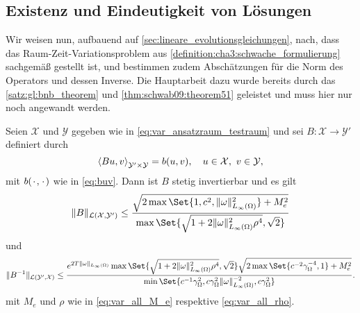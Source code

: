 \subsection{Existenz und Eindeutigkeit von Lösungen} %
\label{sub:existenz_und_eindeutigkeit_von_l_sungen}

Wir weisen nun, aufbauend auf \cref{sec:lineare_evolutionsgleichungen}, nach, dass das Raum-Zeit-Variationsproblem aus \cref{definition:cha3:schwache_formulierung} sachgemäß gestellt ist, und bestimmen zudem Abschätzungen für die Norm des Operators und dessen Inverse.
Die Hauptarbeit dazu wurde bereits durch das \cref{satz:gl:bnb_theorem} und \cref{thm:schwab09:theorem51} geleistet und muss hier nur noch angewandt werden.


\begin{Korollar}
\label{korollar:2.2}
    Seien $\mathcal X$ und $\mathcal Y$ gegeben wie in \cref{eq:var_ansatzraum_testraum} und sei $B \colon \mathcal X \to \mathcal Y'$ definiert durch
    \begin{equation}
        \left\langle Bu,v\right\rangle_{\mathcal Y' \times \mathcal Y}  = b(u, v), \quad u \in \mathcal X,~ v \in \mathcal Y,
    \end{equation}
    mit $b({\mkern2mu\cdot\mkern2mu}, {\mkern2mu\cdot\mkern2mu})$ wie in \cref{eq:buv}.
    Dann ist $B$ stetig invertierbar und es gilt
    \begin{equation}
        \norm{B}_{\mathcal L(\mathcal X, \mathcal Y')}
        \leq
        \frac{\sqrt{2 \max\Set{1, c^{2}, \norm{\omega}_{L_{\infty}(\Omega)}^{2}} + M_{e}^{2}}}{\max\Set{\sqrt{1 + 2 \norm{\omega}_{L_{\infty}(\Omega)}^{2} \rho^{4}}, \sqrt{2} }}
    \end{equation}
    und
    \begin{equation}
        \norm{B^{-1}}_{\mathcal L( \mathcal Y', \mathcal X)}
        \leq \frac{e^{2 T \norm{\omega}_{L_{\infty}(\Omega)}} \max\Set{\sqrt{1 + 2 \norm{\omega}_{L_{\infty}(\Omega)}^{2} \rho^{4}}, \sqrt{2}} \sqrt{2 \max\Set{c^{-2} \gamma_{\Omega}^{-4}, 1} + M_{e}^{2}}}{\min\Set{c^{-1} \gamma_{\Omega}^{2}, c \gamma_{\Omega}^{2} \norm{\omega}_{L_{\infty}(\Omega)}^{-2}, c \gamma_{\Omega}^{2} }}.
    \end{equation}
    mit $M_{e}$ und $\rho$ wie in \cref{eq:var_all_M_e} respektive \cref{eq:var_all_rho}.
\end{Korollar}

